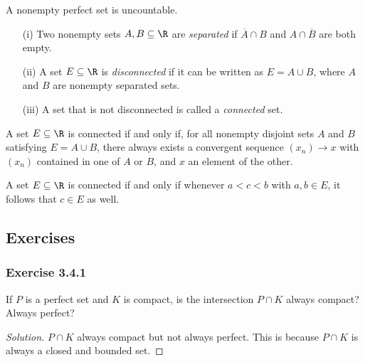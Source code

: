 \begin{tcolorbox}
\begin{thm}
A nonempty perfect set is uncountable.
\end{thm}
\end{tcolorbox}

\begin{tcolorbox}
\begin{defn}
\begin{enumerate}
    \item[(i)] Two nonempty sets \( A,B \subseteq \R   \) are \textit{separated} if \( \overline{A} \cap B  \) and \( A \cap \overline{B} \) are both empty.
    \item[(ii)] A set \( E \subseteq \R  \) is \textit{disconnected}  if it can be written as \( E = A \cup B \), where \( A  \) and \( B \) are nonempty separated sets.
    \item[(iii)] A set that is not disconnected is called a \textit{connected} set. 
\end{enumerate}
\end{defn}
\end{tcolorbox}

\begin{tcolorbox}
\begin{thm}
A set \( E \subseteq \R \) is connected if and only if, for all nonempty disjoint sets \( A \) and \( B \) satisfying \( E = A \cup B \), there always exists a convergent sequence \( (x_n) \to x  \) with \( (x_n) \) contained in one of \( A \) or \( B \), and \( x  \) an element of the other.
\end{thm}
\end{tcolorbox}

\begin{tcolorbox}
\begin{thm}
A set \( E \subseteq \R  \) is connected if and only if whenever \( a < c < b  \) with \( a,b \in E \), it follows that \( c \in E  \) as well.
\end{thm}
\end{tcolorbox}
\subsection{Exercises}


\subsubsection{Exercise 3.4.1} If \( P \) is a perfect set and \( K \) is compact, is the intersection \( P \cap K  \) always compact? Always perfect? 
\begin{proof}[Solution]
\( P \cap K \) always compact but not always perfect. This is because \( P \cap K  \) is always a closed and bounded set.
\end{proof}

